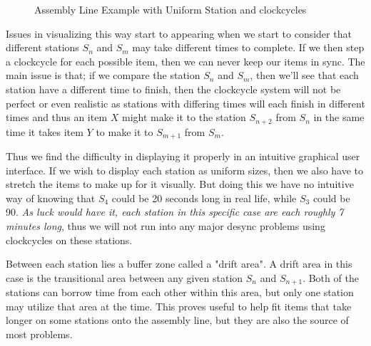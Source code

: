 \documentclass[12pt,a4paper]{report}
\begin{document}
\begin{figure}[ht]
    \caption{Assembly Line Example with Uniform Station and clockcycles}
    \label{fig:assembly}
\end{figure}

    Issues in visualizing this way start to appearing when we start to consider that different stations $S_n$ and $S_m$ may take different times to complete. If we then step a clockcycle for each possible item, then we can never keep our items in sync. The main issue is that; if we compare the station $S_n$ and $S_m$, then we'll see that each station have a different time to finish, then the clockcycle system will not be perfect or even realistic as stations with differing times will each finish in different times and thus an item $X$ might make it to the station $S_{n+2}$ from $S_n$ in the same time it takes item $Y$ to make it to $S_{m+1}$ from $S_{m}$.

Thus we find the difficulty in displaying it properly in an intuitive graphical user interface. If we wish to display each station as uniform sizes, then we also have to stretch the items to make up for it visually. But doing this we have no intuitive way of knowing that $S_4$ could be 20 seconds long in real life, while $S_3$ could be 90. \textit{As luck would have it, each station in this specific case are each roughly 7 minutes long}, thus we will not run into any major desync problems using clockcycles on these stations.

Between each station lies a buffer zone called a "drift area". A drift area in this case is the transitional area between any given station $S_n$ and $S_{n+1}$. Both of the stations can borrow time from each other within this area, but only one station may utilize that area at the time. This proves useful to help fit items that take longer on some stations onto the assembly line, but they are also the source of most problems.
\end{document}
